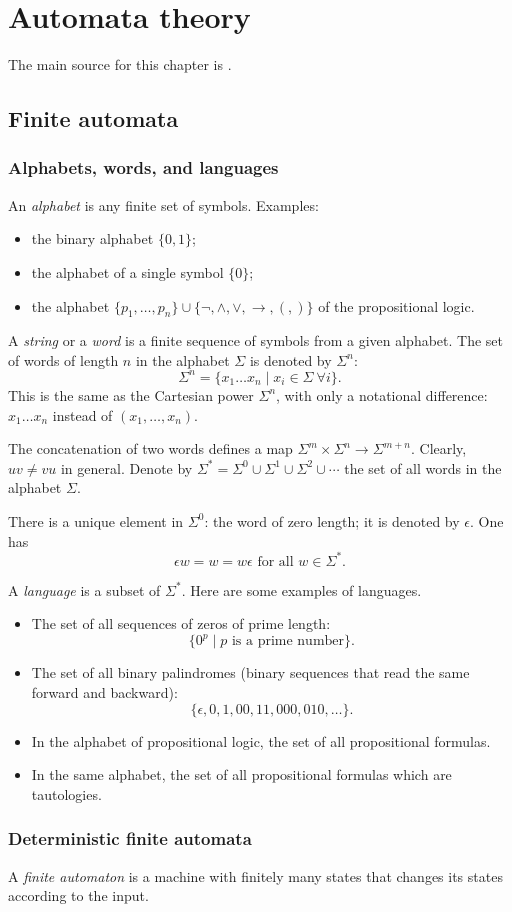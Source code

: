 \chapter{Automata theory}
The main source for this chapter is \cite{HU79}.
\section{Finite automata}
\subsection{Alphabets, words, and languages}
An \emph{alphabet} is any finite set of symbols.
Examples:
\begin{itemize}
\item
the binary alphabet $\{0,1\}$;
\item
the alphabet of a single symbol $\{0\}$;
\item
the alphabet $\{p_1, \ldots, p_n\} \cup \{\neg, \wedge, \vee, \to, (, )\}$ of the propositional logic.
\end{itemize}

A \emph{string} or a \emph{word} is a finite sequence of symbols from a given alphabet.
The set of words of length $n$ in the alphabet $\Sigma$ is denoted by $\Sigma^n$:
\[
\Sigma^n = \{x_1 \ldots x_n \mid x_i \in \Sigma\ \forall i\}.
\]
This is the same as the Cartesian power $\Sigma^n$, with only a notational difference: $x_1 \ldots x_n$
instead of $(x_1, \ldots, x_n)$.

The concatenation of two words defines a map $\Sigma^m \times \Sigma^n \to \Sigma^{m+n}$.
Clearly, $uv \ne vu$ in general.
Denote by $\Sigma^* = \Sigma^0 \cup \Sigma^1 \cup \Sigma^2 \cup \cdots$ the set of all words in the alphabet $\Sigma$.

There is a unique element in $\Sigma^0$: the word of zero length; it is denoted by $\epsilon$.
One has
\[
\epsilon w = w = w\epsilon \text{ for all } w \in \Sigma^*.
\]

A \emph{language} is a subset of $\Sigma^*$.
Here are some examples of languages.

\begin{itemize}
\item
The set of all sequences of zeros of prime length:
\[
\{0^p \mid p \text{ is a prime number}\}.
\]
\item
The set of all binary palindromes (binary sequences that read the same forward and backward):
\[
\{\epsilon, 0, 1, 00, 11, 000, 010, \ldots\}.
\]
\item
In the alphabet of propositional logic, the set of all propositional formulas.
\item
In the same alphabet, the set of all propositional formulas which are tautologies.
\end{itemize}





\subsection{Deterministic finite automata}
A \emph{finite automaton} is a machine with finitely many states that changes its states according to the input.
